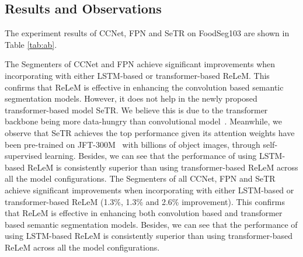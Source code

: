 \vspace{-2mm}
\subsection{Results and Observations}
The experiment results of CCNet, FPN and SeTR on FoodSeg103 are shown in Table \ref{tab:ab}. 


\begin{table}[tph]
		\centering
		\caption{Semantic segmentation results of our ReLeM plugged into three baseline methods (on the FoodSeg103 dataset). We implement two variants of ReLeM using LSTM and Transformer, respectively, to encode recipes. 
}\label{tab:ab}
		\vspace{-4mm}
	\end{table} \vspace{-1mm}
The Segmenters of CCNet and FPN achieve significant improvements when incorporating with either LSTM-based or transformer-based ReLeM.
This confirms that ReLeM is effective in enhancing the convolution based semantic segmentation models.
However, it does not help in the newly proposed transformer-based model SeTR.
We believe this is due to the transformer backbone being more data-hungry than convolutional model~\cite{dosovitskiy2021an}.
Meanwhile, we observe that SeTR achieves the top performance given its attention weights have been pre-trained on JFT-300M~\cite{sun2017revisiting} with billions of object images, through self-supervised learning.
Besides, we can see that the performance of using LSTM-based ReLeM is consistently superior than using transformer-based ReLeM across all the model configurations. 
\fi
The Segmenters of all CCNet, FPN and SeTR achieve significant improvements when incorporating with either LSTM-based or transformer-based ReLeM (1.3\%, 1.3\% and 2.6\% improvement). 
This confirms that ReLeM is effective in enhancing both convolution based and transformer based semantic segmentation models.
Besides, we can see that the performance of using LSTM-based ReLeM is consistently superior than using transformer-based ReLeM across all the model configurations. 
